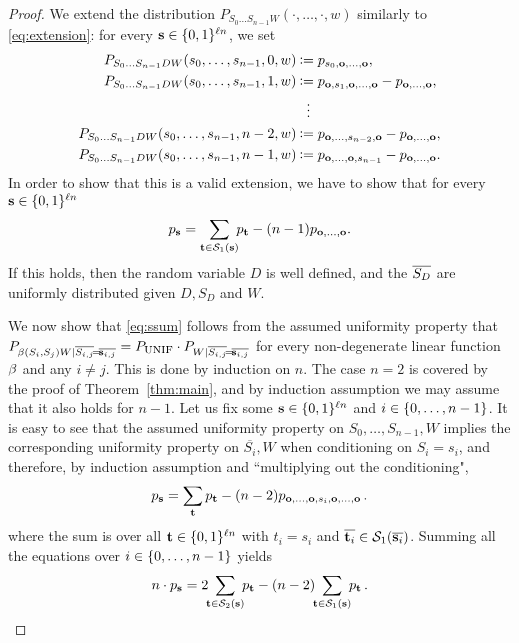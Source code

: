 \begin{proof}
We extend the distribution $P_{S_0 \ldots
  S_{n-1}W}(\cdot,\ldots,\cdot,w)$ similarly to \eqref{eq:extension}:
for every $\text{\boldmath${\bf s}$} \in \{0,1\}^{\ell n}$, we set
\begin{align*}
P_{S_0 \ldots S_{n-1}DW}(s_0,\ldots,s_{n-1},0,w) &\assign p_{s_0,\zero,\ldots,\zero}, \\
P_{S_0 \ldots S_{n-1}DW}(s_0,\ldots,s_{n-1},1,w) &\assign
p_{\zero,s_1,\zero,\ldots,\zero} - p_{\zero,\ldots,\zero}, \\
& \;\;\,\vdots \\
P_{S_0 \ldots S_{n-1}DW}(s_0,\ldots,s_{n-1},n-2,w) &\assign p_{\zero,\ldots,s_{n-2},\zero}- p_{\zero,\ldots,\zero}, \\
P_{S_0 \ldots S_{n-1}DW}(s_0,\ldots,s_{n-1},n-1,w) &\assign p_{\zero,\ldots,\zero,s_{n-1}}- p_{\zero,\ldots,\zero}.
\end{align*}
In order to show that this is a valid extension, we have to show that
for every $\text{\boldmath${\bf s}$} \in \{0,1\}^{\ell n}$
\begin{equation} \label{eq:ssum}
p_{\text{\boldmath${\bf s}$}}= \sum_{\text{\boldmath${\bf t}$} \in {\cal S}_1(\text{\boldmath${\bf s}$})} \!\! p_{\text{\boldmath${\bf t}$}} - (n-1)p_{\text{\boldmath${\bf o}$},\ldots,\text{\boldmath${\bf o}$}}.
\end{equation}
If this holds, then the random variable $D$ is well defined, and  
the $\overline{S_D}$ are uniformly distributed given $D,S_D$ and $W$.

We now show that \eqref{eq:ssum} follows from the assumed uniformity
property that $P_{\beta(S_i,S_j) W | \overline{S_{i,j}} \!=\!\overline{\text{\boldmath${\bf s}$}_{i,j}}} =
P_{\mbox{\sc unif}} \cdot P_{W | \overline{S_{i,j}}\!=\!\overline{\text{\boldmath${\bf s}$}_{i,j}}}$ for every
non-degenerate linear function $\beta$ and any $i \neq j$. This is done
by induction on $n$. The case $n = 2$ is covered by the proof of
Theorem~\ref{thm:main}, and by induction assumption we may assume that
it also holds for $n-1$.  Let us fix some $\text{\boldmath${\bf s}$} \in \{0,1\}^{\ell n}$
and $i \in \{0,\ldots,n-1\}$. It is easy to see that the assumed
uniformity property on $S_0,\ldots,S_{n-1},W$ implies the
corresponding uniformity property on $\overline{S_i},W$ when
conditioning on $S_i = s_i$, and therefore, by induction assumption
and ``multiplying out the conditioning",
\begin{equation}
p_{\text{\boldmath${\bf s}$}} = \sum_{\text{\boldmath${\bf t}$}} p_{\text{\boldmath${\bf t}$}} -
(n-2)p_{\text{\boldmath${\bf o}$},\ldots,\text{\boldmath${\bf o}$},s_i,\text{\boldmath${\bf o}$},\ldots,\text{\boldmath${\bf o}$}} \,. \label{eq:texample}
\end{equation}
where the sum is over all $\text{\boldmath${\bf t}$} \in \{0,1\}^{\ell n}$ with $t_i =
s_i$ and $\overline{\text{\boldmath${\bf t}$}_i} \in {\cal S}_1(\overline{\text{\boldmath${\bf s}$}_i})$.
Summing all the equations over $i \in
\{0,\ldots,n-1\}$ yields
\begin{equation} \label{eq:firststep}
n \cdot p_{\bs} = 2 \!\! \sum_{\b{t} \in \Stwo} \!\! p_{\b{t}} - (n-2) \!\!
\sum_{\b{t} \in \Sone} \!\! p_{\b{t}} \,.
\end{equation}


\end{proof}
